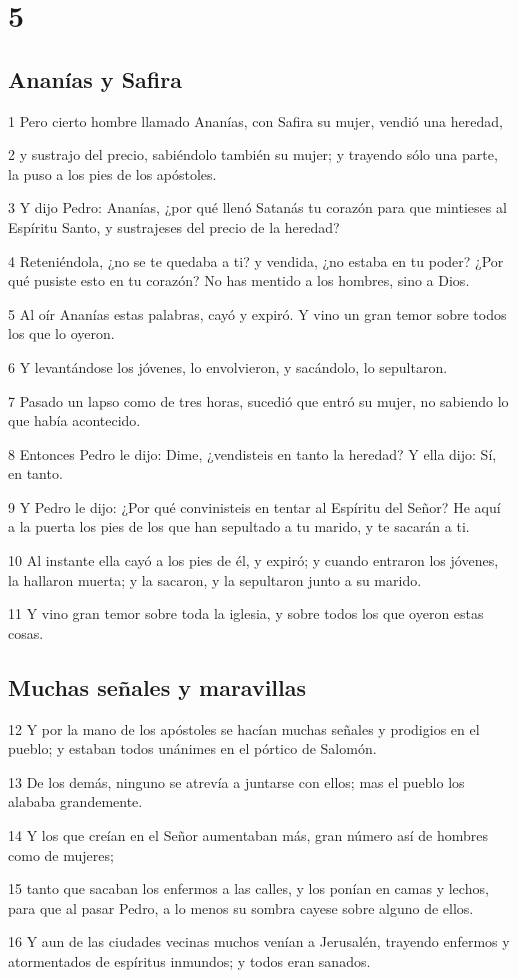 \chapter{5}

\section*{Ananías y Safira}

\par 1 Pero cierto hombre llamado Ananías, con Safira su mujer, vendió una heredad,
\par 2 y sustrajo del precio, sabiéndolo también su mujer; y trayendo sólo una parte, la puso a los pies de los apóstoles.
\par 3 Y dijo Pedro: Ananías, ¿por qué llenó Satanás tu corazón para que mintieses al Espíritu Santo, y sustrajeses del precio de la heredad?
\par 4 Reteniéndola, ¿no se te quedaba a ti? y vendida, ¿no estaba en tu poder? ¿Por qué pusiste esto en tu corazón? No has mentido a los hombres, sino a Dios.
\par 5 Al oír Ananías estas palabras, cayó y expiró. Y vino un gran temor sobre todos los que lo oyeron.
\par 6 Y levantándose los jóvenes, lo envolvieron, y sacándolo, lo sepultaron.
\par 7 Pasado un lapso como de tres horas, sucedió que entró su mujer, no sabiendo lo que había acontecido.
\par 8 Entonces Pedro le dijo: Dime, ¿vendisteis en tanto la heredad? Y ella dijo: Sí, en tanto.
\par 9 Y Pedro le dijo: ¿Por qué convinisteis en tentar al Espíritu del Señor? He aquí a la puerta los pies de los que han sepultado a tu marido, y te sacarán a ti.
\par 10 Al instante ella cayó a los pies de él, y expiró; y cuando entraron los jóvenes, la hallaron muerta; y la sacaron, y la sepultaron junto a su marido.
\par 11 Y vino gran temor sobre toda la iglesia, y sobre todos los que oyeron estas cosas.

\section*{Muchas señales y maravillas}

\par 12 Y por la mano de los apóstoles se hacían muchas señales y prodigios en el pueblo; y estaban todos unánimes en el pórtico de Salomón.
\par 13 De los demás, ninguno se atrevía a juntarse con ellos; mas el pueblo los alababa grandemente.
\par 14 Y los que creían en el Señor aumentaban más, gran número así de hombres como de mujeres;
\par 15 tanto que sacaban los enfermos a las calles, y los ponían en camas y lechos, para que al pasar Pedro, a lo menos su sombra cayese sobre alguno de ellos.
\par 16 Y aun de las ciudades vecinas muchos venían a Jerusalén, trayendo enfermos y atormentados de espíritus inmundos; y todos eran sanados.

